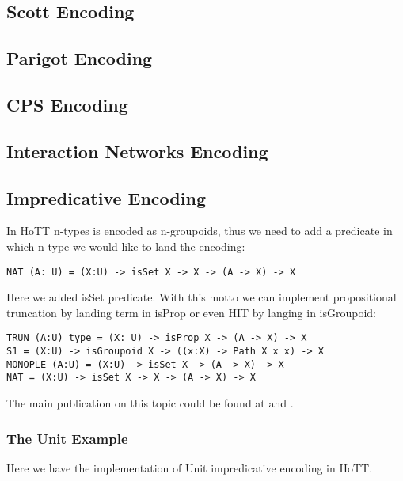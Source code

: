\documentclass{article}
\theoremstyle{definition}
\begin{document}
\subsection{Scott Encoding}

\subsection{Parigot Encoding}

\subsection{CPS Encoding}

\subsection{Interaction Networks Encoding}

\subsection{Impredicative Encoding}

In HoTT n-types is encoded as n-groupoids, thus we need to add a predicate in which n-type
we would like to land the encoding:

\begin{lstlisting}[mathescape=true]
NAT (A: U) = (X:U) -> isSet X -> X -> (A -> X) -> X
\end{lstlisting}

Here we added isSet predicate. With this motto we can implement propositional
truncation by landing term in isProp or even HIT by langing in isGroupoid:

\begin{lstlisting}[mathescape=true]
TRUN (A:U) type = (X: U) -> isProp X -> (A -> X) -> X
S1 = (X:U) -> isGroupoid X -> ((x:X) -> Path X x x) -> X
MONOPLE (A:U) = (X:U) -> isSet X -> (A -> X) -> X
NAT = (X:U) -> isSet X -> X -> (A -> X) -> X
\end{lstlisting}

The main publication on this topic could be found at \cite{Awodey17} and \cite{Speight17}.

\subsubsection*{The Unit Example}

Here we have the implementation of Unit impredicative encoding in HoTT.
\end{document}
